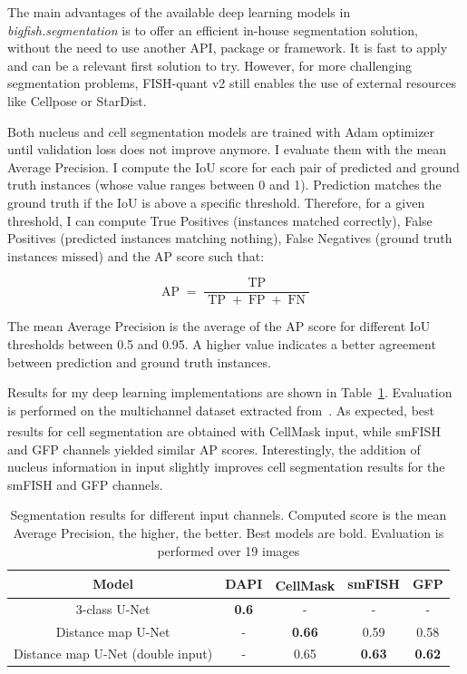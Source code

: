 The main advantages of the available deep learning models in \emph{bigfish.segmentation} is to offer an efficient in-house segmentation solution, without the need to use another API, package or framework.
It is fast to apply and can be a relevant first solution to try.
However, for more challenging segmentation problems, FISH-quant v2 still enables the use of external resources like Cellpose or StarDist.

Both nucleus and cell segmentation models are trained with Adam optimizer~\cite{Diederik_2015} until validation loss does not improve anymore.
I evaluate them with the mean Average Precision.
I compute the \ac{IoU} score for each pair of predicted and ground truth instances (whose value ranges between 0 and 1).
Prediction matches the ground truth if the \ac{IoU} is above a specific threshold.
Therefore, for a given threshold, I can compute True Positives (instances matched correctly), False Positives (predicted instances matching nothing), False Negatives (ground truth instances missed) and the \ac{AP} score such that:

\begin{equation}
	{\displaystyle \operatorname{AP} = \frac{\operatorname{TP}}{\operatorname{TP} + \operatorname{FP} + \operatorname{FN}}}
\end{equation}

\noindent
The mean Average Precision is the average of the \ac{AP} score for different \ac{IoU} thresholds between 0.5 and 0.95.
A higher value indicates a better agreement between prediction and ground truth instances.

Results for my deep learning implementations are shown in Table~\ref{table:segmentation_results}.
Evaluation is performed on the multichannel dataset extracted from~\cite{safieddine_choreography_2021}.
As expected, best results for cell segmentation are obtained with CellMask\textsuperscript{\texttrademark} input, while \ac{smFISH} and \ac{GFP} channels yielded similar \ac{AP} scores.
Interestingly, the addition of nucleus information in input slightly improves cell segmentation results for the \ac{smFISH} and \ac{GFP} channels.

\begin{table}[]
	\centering
	\begin{tabular}{| c | c | c | c | c |}
		\hline
		Model & DAPI & CellMask\textsuperscript{\texttrademark} & smFISH & GFP\\
		\hline
		3-class U-Net & \textbf{0.6} & - & - & -\\
		Distance map U-Net & - & \textbf{0.66} & 0.59 & 0.58\\
		Distance map U-Net (double input) & - & 0.65 & \textbf{0.63} & \textbf{0.62}\\
		\hline
	\end{tabular}
	\caption[Segmentation results]{Segmentation results for different input channels.
	Computed score is the mean Average Precision, the higher, the better.
	Best models are bold.
	Evaluation is performed over 19 images}
	\label{table:segmentation_results}
\end{table}

